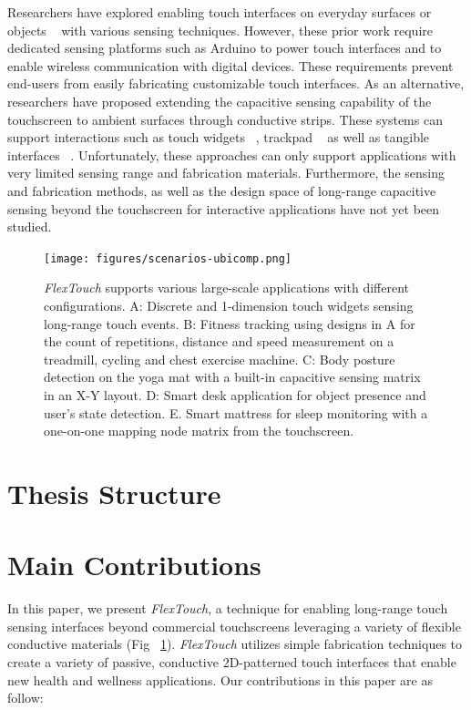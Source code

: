 Researchers have explored enabling touch interfaces on everyday surfaces or objects ~\cite{Ono-Touch-and-Activate, Ono-2014,Sato-Touche, Xiao-WorldKit, Rekimoto-SmartSkin, olberding2013cuttable, Zhang-Electrick} with various sensing techniques. However, these prior work require dedicated sensing platforms such as Arduino to power touch interfaces and to enable wireless communication with digital devices. These requirements prevent end-users from easily fabricating customizable touch interfaces. As an alternative, researchers have proposed extending the capacitive sensing capability of the touchscreen to ambient surfaces through conductive strips. These systems can support interactions such as touch widgets ~\cite{Kato2015a,Kato2015,Kato2016}, trackpad ~\cite{mobicom-gao18} as well as tangible interfaces ~\cite{Schmitz2017, Schmitz2018, Chan-CapStones}. Unfortunately, these approaches can only support applications with very limited sensing range and fabrication materials. Furthermore, the sensing and fabrication methods, as well as the design space of long-range capacitive sensing beyond the touchscreen for interactive applications have not yet been studied. 

\begin{figure}
\centering
  \texttt{[image: figures/scenarios-ubicomp.png]}
  \setlength{\belowcaptionskip}{-8pt}
  \caption{\textit{FlexTouch} supports various large-scale applications with different configurations. A: Discrete and 1-dimension touch widgets sensing long-range touch events. B: Fitness tracking using designs in A for the count of repetitions, distance and speed measurement on a treadmill, cycling and chest exercise machine. C: Body posture detection on the yoga mat with a built-in capacitive sensing matrix in an X-Y layout. D: Smart desk application for object presence and user's state detection. E. Smart mattress for sleep monitoring with a one-on-one mapping node matrix from the touchscreen.}
  \label{fig:scenarios}
  
\end{figure}
\section{Thesis Structure}
\section{Main Contributions}
In this paper, we present \textit{FlexTouch}, a technique for enabling long-range touch sensing interfaces beyond commercial touchscreens leveraging a variety of flexible conductive materials (Fig ~\ref{fig:scenarios}). \textit{FlexTouch} utilizes simple fabrication techniques to create a variety of passive, conductive 2D-patterned touch interfaces that enable new health and wellness applications. Our contributions in this paper are as follow:

